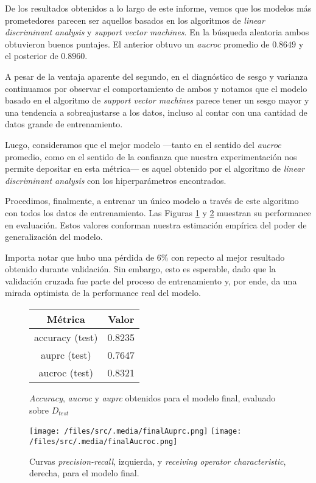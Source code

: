 De los resultados obtenidos a lo largo de este informe, vemos que los modelos más prometedores parecen ser aquellos basados en los algoritmos de \textit{linear discriminant analysis} y \textit{support vector machines}. En la búsqueda aleatoria ambos obtuvieron buenos puntajes. El anterior obtuvo un \textit{aucroc} promedio de $0.8649$ y el posterior de $0.8960$.

A pesar de la ventaja aparente del segundo, en el diagnóstico de sesgo y varianza continuamos por observar el comportamiento de ambos y notamos que el modelo basado en el algoritmo de \textit{support vector machines} parece tener un sesgo mayor y una tendencia a sobreajustarse a los datos, incluso al contar con una cantidad de datos grande de entrenamiento.

Luego, consideramos que el mejor modelo ---tanto en el sentido del \textit{aucroc} promedio, como en el sentido de la confianza que nuestra experimentación nos permite depositar en esta métrica--- es aquel obtenido por el algoritmo de \textit{linear discriminant analysis} con los hiperparámetros encontrados.  

Procedimos, finalmente, a entrenar un único modelo a través de este algoritmo con todos los datos de entrenamiento. Las Figuras \ref{metricas_final} y \ref{curvas_final} muestran su performance en evaluación. Estos valores conforman nuestra estimación empírica del poder de generalización del modelo.

Importa notar que hubo una pérdida de $6\%$ con repecto al mejor resultado obtenido durante validación. Sin embargo, esto es esperable, dado que la validación cruzada fue parte del proceso de entrenamiento y, por ende, da una mirada optimista de la performance real del modelo.

\vspace{0.5em}
\begin{figure}[!htbp]
    \begin{center}
        \begin{tabular}{ |c|c| } 
         \hline
        Métrica         & Valor \\
        \hline
        accuracy (test) &  0.8235 \\
        auprc (test)    &  0.7647 \\
        aucroc (test)   &  0.8321 \\
        \hline
        \end{tabular}
    \end{center}
    \caption{\textit{Accuracy}, \textit{aucroc} y \textit{auprc} obtenidos para el modelo final, evaluado sobre $D_{test}$} \label{metricas_final}
\end{figure}

\begin{figure}[!htbp]
    \centering 
    \texttt{[image: /files/src/.media/finalAuprc.png]}
    \texttt{[image: /files/src/.media/finalAucroc.png]}
    \caption{Curvas \textit{precision-recall}, izquierda, y \textit{receiving operator characteristic}, derecha, para el modelo final.}
    \label{curvas_final}
\end{figure}
